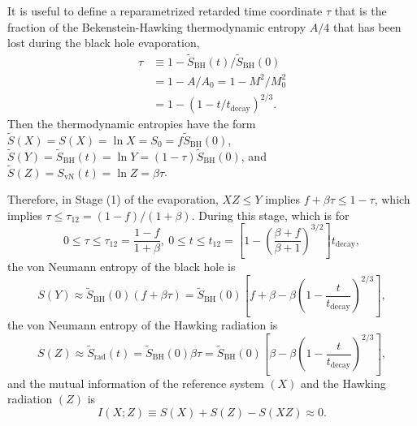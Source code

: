 \documentclass[12pt]{article}
\begin{document}
It is useful to define a reparametrized retarded time coordinate $\tau$ that is the fraction of the Bekenstein-Hawking thermodynamic entropy $A/4$ that has been lost during the black hole evaporation,
\begin{equation}
\begin{split}
\tau &\equiv 1 - \tilde{S}_\mathrm{BH}(t)/\tilde{S}_\mathrm{BH}(0) \\
     &= 1 - A/A_0 = 1 - M^2/M_0^2 \\
     &= 1 - (1 - t/t_\mathrm{decay})^{2/3}.
\label{tau-time}
\end{split}
\end{equation}
Then the thermodynamic entropies have the form $\tilde{S}(X) = S(X) = \ln{X} = S_0 = f \tilde{S}_\mathrm{BH}(0)$, $\tilde{S}(Y) = \tilde{S}_\mathrm{BH}(t) = \ln{Y} = (1-\tau)\tilde{S}_\mathrm{BH}(0)$, and $\tilde{S}(Z) = S_\mathrm{vN}(t) = \ln{Z} = \beta\tau$.

Therefore, in Stage (1) of the evaporation, $XZ \leq Y$ implies $f + \beta\tau \leq 1-\tau$, which implies $\tau \leq \tau_{12} = (1-f)/(1+\beta)$.  During this stage, which is for
\begin{equation}
0 \leq \tau \leq \tau_{12} = \frac{1-f}{1+\beta},\ 0 \leq t \leq t_{12} 
  = \left[1-\left(\frac{\beta+f}{\beta+1}\right)^{3/2}\right]t_\mathrm{decay},
\label{tau1}
\end{equation}
the von Neumann entropy of the black hole is
\begin{equation}
S(Y) \approx \tilde{S}_\mathrm{BH}(0)(f+\beta\tau)
     = \tilde{S}_\mathrm{BH}(0)\left[f+\beta-\beta\left(1-\frac{t}{t_\mathrm{decay}}
           \right)^{2/3}\right],
\label{S1Y}
\end{equation}
the von Neumann entropy of the Hawking radiation is
\begin{equation}
S(Z) \approx \tilde{S}_\mathrm{rad}(t) = \tilde{S}_\mathrm{BH}(0)\beta\tau
     = \tilde{S}_\mathrm{BH}(0)\left[\beta-\beta\left(1-\frac{t}{t_\mathrm{decay}}
           \right)^{2/3}\right],
\label{S1Z}
\end{equation}
and the mutual information of the reference system $(X)$ and the Hawking radiation $(Z)$ is
\begin{equation}
I(X;Z) \equiv S(X)+S(Z)-S(XZ) \approx 0.
\label{mutual1}
\end{equation}
\end{document}
